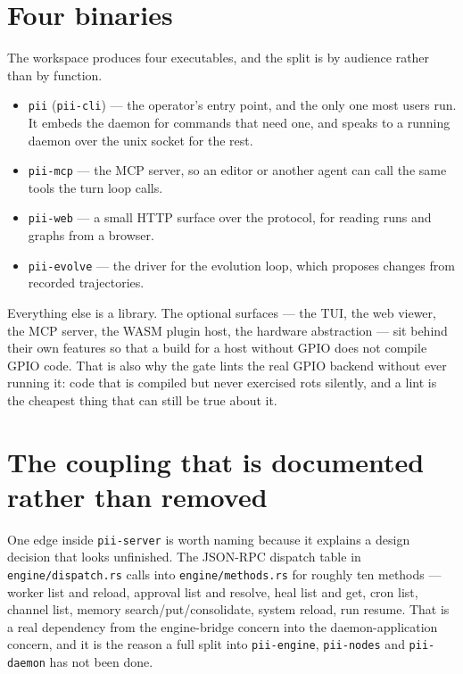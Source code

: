 \section{Four binaries}

The workspace produces four executables, and the split is by audience rather than by function.

\begin{itemize}
	\item \texttt{pii} (\texttt{pii-cli}) --- the operator's entry point, and the only one most
	users run. It embeds the daemon for commands that need one, and speaks to a running daemon over
	the unix socket for the rest.
	\item \texttt{pii-mcp} --- the MCP server, so an editor or another agent can call the same
	tools the turn loop calls.
	\item \texttt{pii-web} --- a small HTTP surface over the protocol, for reading runs and graphs
	from a browser.
	\item \texttt{pii-evolve} --- the driver for the evolution loop, which proposes changes from
	recorded trajectories.
\end{itemize}

Everything else is a library. The optional surfaces --- the TUI, the web viewer, the MCP server,
the WASM plugin host, the hardware abstraction --- sit behind their own features so that a build for
a host without GPIO does not compile GPIO code. That is also why the gate lints the real GPIO
backend without ever running it: code that is compiled but never exercised rots silently, and a
lint is the cheapest thing that can still be true about it.

\section{The coupling that is documented rather than removed}

One edge inside \texttt{pii-server} is worth naming because it explains a design decision that
looks unfinished. The JSON-RPC dispatch table in \texttt{engine/dispatch.rs} calls into
\texttt{engine/methods.rs} for roughly ten methods --- worker list and reload, approval list and
resolve, heal list and get, cron list, channel list, memory search/put/consolidate, system reload,
run resume. That is a real dependency from the engine-bridge concern into the daemon-application
concern, and it is the reason a full split into \texttt{pii-engine}, \texttt{pii-nodes} and
\texttt{pii-daemon} has not been done.

